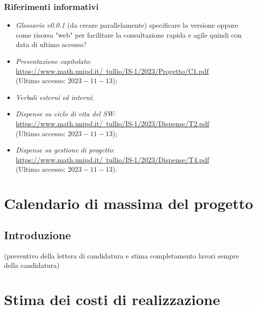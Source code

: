 \documentclass[10pt, a4paper]{article}
\begin{document}
\subsubsection{Riferimenti informativi}
\begin{itemize}
    \item \textit{Glossario v0.0.1} (da creare parallelamente) specificare la versione oppure come risorsa "web" per facilitare la consultazione rapida e agile quindi con data di ultimo accesso?
   
    \item \textit{Presentazione capitolato}:\\
    \href{https://www.math.unipd.it/~tullio/IS-1/2023/Progetto/C1.pdf}{https://www.math.unipd.it/~tullio/IS-1/2023/Progetto/C1.pdf}\\
    (Ultimo accesso: $2023-11-13$);   
    
    \item \textit{Verbali esterni ed interni};
    
    \item \textit{Dispense su ciclo di vita del SW}:\\
    \href{https://www.math.unipd.it/~tullio/IS-1/2023/Dispense/T2.pdf}{https://www.math.unipd.it/~tullio/IS-1/2023/Dispense/T2.pdf}\\
    (Ultimo accesso: $2023-11-13$);
    
    \item  \textit{Dispense su gestione di progetto}:\\
    \href{https://www.math.unipd.it/~tullio/IS-1/2023/Dispense/T4.pdf}{https://www.math.unipd.it/~tullio/IS-1/2023/Dispense/T4.pdf}\\
    (Ultimo accesso: $2023-11-13$).
\end{itemize}


\section{Calendario di massima del progetto}

\subsection{Introduzione}
\color{gray}(preventivo  della lettera di candidatura e stima completamento lavori sempre della candidatura)
\color{black}

\section{Stima dei costi di realizzazione}
\end{document}
